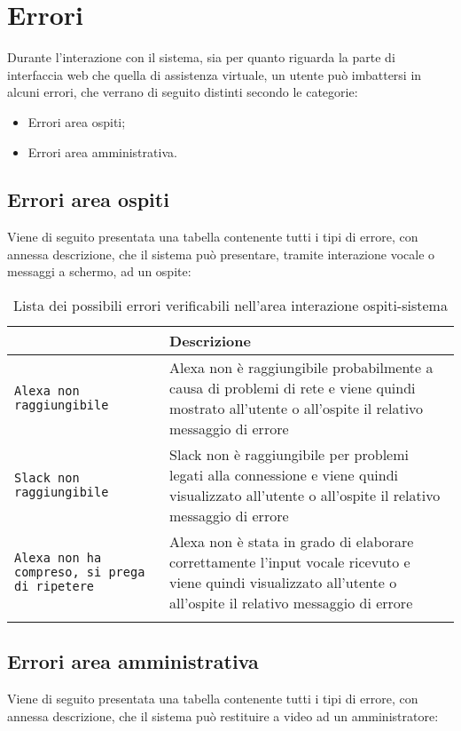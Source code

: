 \documentclass[../ManualeUtente_v1.0.0.tex]{subfiles}
\begin{document}
	\section{Errori}
		Durante l'interazione con il sistema, sia per quanto riguarda la parte di interfaccia web che quella di assistenza virtuale, un utente può imbattersi in alcuni errori, che verrano di seguito distinti secondo le categorie:
		\begin{itemize}
			\item Errori area ospiti;
			\item Errori area amministrativa.
		\end{itemize}

		\subsection{Errori area ospiti}
			Viene di seguito presentata una tabella contenente tutti i tipi di errore, con annessa descrizione, che il sistema può presentare, tramite interazione vocale o messaggi a schermo, ad un ospite:

			\begin{longtable}[c] { >{\centering\arraybackslash}p{5cm} p{10cm} }
				\toprule
				{\textbf{Errore}} & {\textbf{Descrizione}} \\
				\midrule
				\texttt{Alexa non raggiungibile} & Alexa non è raggiungibile probabilmente a causa di problemi di rete e viene quindi mostrato all’utente o all’ospite il relativo messaggio di errore \\
		 		\addlinespace[0.3em]
				\midrule
				\texttt{Slack non raggiungibile} & Slack non è raggiungibile per problemi legati alla connessione e viene quindi visualizzato all’utente o all’ospite il relativo messaggio di errore \\
				\addlinespace[0.3em]
				\midrule
				\texttt{Alexa non ha compreso, si prega di ripetere} & Alexa non è stata in grado di elaborare correttamente l'input vocale ricevuto e viene quindi visualizzato all’utente o all’ospite il relativo messaggio di errore \\
		 		\addlinespace[0.3em]
		 		\bottomrule
		 		\caption{Lista dei possibili errori verificabili nell'area interazione ospiti-sistema}
		 	\end{longtable}

		\subsection{Errori area amministrativa}
			Viene di seguito presentata una tabella contenente tutti i tipi di errore, con annessa descrizione, che il sistema può restituire a video ad un amministratore:
\end{document}
